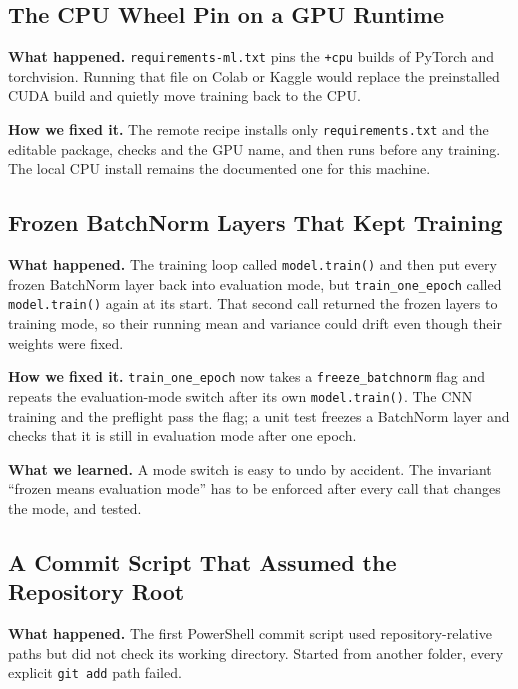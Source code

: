 \subsection{The CPU Wheel Pin on a GPU Runtime}
\label{sec:challenge-cpu-pin}

\textbf{What happened.} \texttt{requirements-ml.txt} pins the \texttt{+cpu} builds of PyTorch and torchvision. Running that file on Colab or Kaggle would replace the preinstalled CUDA build and quietly move training back to the CPU.

\textbf{How we fixed it.} The remote recipe installs only \texttt{requirements.txt} and the editable package, checks  and the GPU name, and then runs  before any training. The local CPU install remains the documented one for this machine.

\subsection{Frozen BatchNorm Layers That Kept Training}
\label{sec:challenge-frozen-bn}

\textbf{What happened.} The training loop called \texttt{model.train()} and then put every frozen BatchNorm layer back into evaluation mode, but \texttt{train\_one\_epoch} called \texttt{model.train()} again at its start. That second call returned the frozen layers to training mode, so their running mean and variance could drift even though their weights were fixed.

\textbf{How we fixed it.} \texttt{train\_one\_epoch} now takes a \texttt{freeze\_batchnorm} flag and repeats the evaluation-mode switch after its own \texttt{model.train()}. The CNN training and the preflight pass the flag; a unit test freezes a BatchNorm layer and checks that it is still in evaluation mode after one epoch.

\textbf{What we learned.} A mode switch is easy to undo by accident. The invariant ``frozen means evaluation mode'' has to be enforced after every call that changes the mode, and tested.

\subsection{A Commit Script That Assumed the Repository Root}
\label{sec:challenge-commit-script}

\textbf{What happened.} The first PowerShell commit script used repository-relative paths but did not check its working directory. Started from another folder, every explicit \texttt{git add} path failed.

